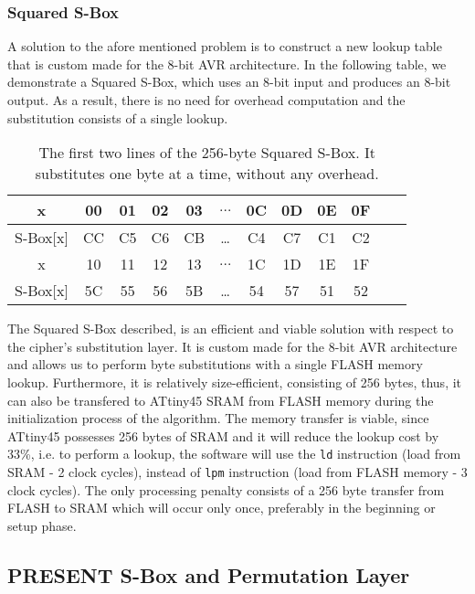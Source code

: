 \documentclass[11pt]{article}
\begin{document}
\subsubsection{Squared S-Box}\label{ssbox}
A solution to the afore mentioned problem is to construct a new lookup table that is custom made for the 8-bit AVR architecture. In the following table, we demonstrate a Squared S-Box, which uses an 8-bit input and produces an 8-bit output. As a result, there is no need for overhead computation and the substitution consists of a single lookup.\\
\begin{table}[h]
\centering
\begin{tabular}{| c | c  | c | c | c  | c  | c | c | c  | c | c | c |}
\hline
  x & 00 & 01 & 02 & 03  &  $\dots$  & 0C & 0D & 0E & 0F   \\
\hline
 S-Box[x] & CC & C5 & C6 & CB & \dots & C4 & C7 & C1 & C2   \\
\hline
  x & 10 & 11 & 12 & 13  &  $\dots$  & 1C & 1D & 1E & 1F   \\
\hline
 S-Box[x] & 5C & 55 & 56 & 5B & \dots & 54 & 57 & 51 & 52   \\

\hline
\end{tabular}
 \caption{\small The first two lines of the 256-byte Squared S-Box. It substitutes one byte at a time, without any overhead.}
\end{table}
The Squared S-Box described, is an efficient and viable solution with respect to the cipher's substitution layer. It is custom made for the 8-bit AVR architecture and allows us to perform byte substitutions with a single FLASH memory lookup. Furthermore, it is relatively size-efficient, consisting of 256 bytes, thus, it can also be transfered to ATtiny45 SRAM from FLASH memory during the initialization process of the algorithm. The memory transfer is viable, since ATtiny45 possesses 256 bytes of SRAM and it will reduce the lookup cost by 33\%, i.e. to perform a lookup, the software will use the \texttt{ld} instruction (load from SRAM - 2 clock cycles), instead of  \texttt{lpm} instruction (load from FLASH memory - 3 clock cycles). The only processing penalty consists of a 256 byte transfer from FLASH to SRAM which will occur only once, preferably in the beginning or setup phase.
\subsection{PRESENT S-Box and Permutation Layer}
\end{document}
